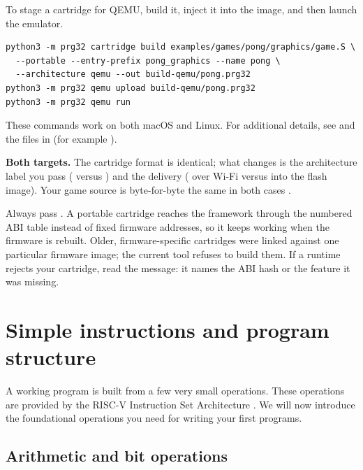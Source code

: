 To stage a cartridge for QEMU, build it, inject it into the image, and then
launch the emulator.

\begin{lstlisting}[style=bash,caption={Build and stage a portable cartridge for QEMU}]
python3 -m prg32 cartridge build examples/games/pong/graphics/game.S \
  --portable --entry-prefix pong_graphics --name pong \
  --architecture qemu --out build-qemu/pong.prg32
python3 -m prg32 qemu upload build-qemu/pong.prg32
python3 -m prg32 qemu run
\end{lstlisting}

These commands work on both macOS and Linux. For additional details, see
 and the files in  (for example ).

\begin{prgtargets}
\textbf{Both targets.} The cartridge format is identical; what changes is the
architecture label you pass ( versus ) and the
delivery (\code{upload} over Wi-Fi versus \code{qemu upload} into the flash
image). Your game source is byte-for-byte the same in both cases
\citep{prg32qemu}.
\end{prgtargets}

\begin{prgwarn}
Always pass . A portable cartridge reaches the framework through
the numbered ABI table instead of fixed firmware addresses, so it keeps working
when the firmware is rebuilt. Older, firmware-specific cartridges were linked
against one particular firmware image; the current tool refuses to build them.
If a runtime rejects your cartridge, read the message: it names the ABI hash or
the feature it was missing.
\end{prgwarn}

\section{Simple instructions and program structure}

A working program is built from a few very small operations. These
operations are provided by the RISC-V Instruction Set Architecture \citep{riscvisa}.
We will now introduce the foundational operations you need for writing
your first programs.

\subsection{Arithmetic and bit operations}

